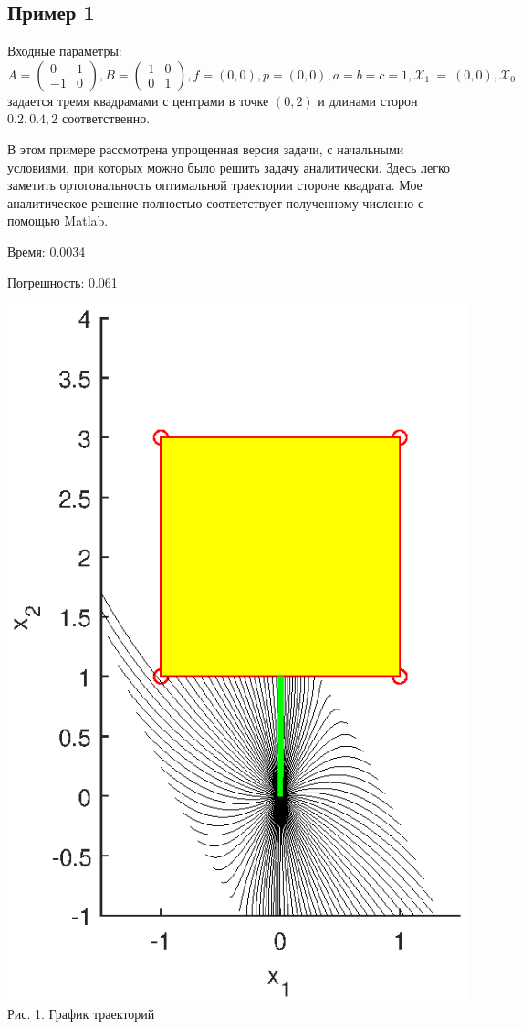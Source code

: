 \documentclass{article}
\theoremstyle{definition}
\begin{document}
\subsection{Пример 1}

Входные параметры: $A = \begin{pmatrix} 0 & 1 \\ -1 & 0\end{pmatrix}, B = \begin{pmatrix} 1 & 0 \\ 0 & 1\end{pmatrix}, 
f = (0, 0), p = (0,0), a = b = c = 1, \mathcal{X}_1~=~(0,0), \mathcal{X}_0$ задается тремя квадрамами с центрами в точке 
$(0, 2)$ и длинами сторон $0.2, 0.4, 2$ соответственно.

В этом примере рассмотрена упрощенная версия задачи,
с начальными условиями, при которых можно было решить задачу аналитически.
Здесь легко заметить ортогональность оптимальной траектории стороне квадрата.
Мое аналитическое решение полностью соответствует полученному численно с помощью Matlab.

Время: 0.0034

Погрешность: 0.061

\begin{center}
{\includegraphics[width=15cm]{example1.eps}}
{Рис. 1. График траекторий}
\end{center}
\end{document}
